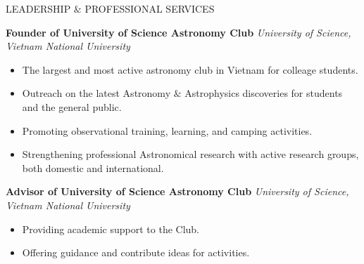 \documentclass{resume} %
\begin{document}

 


\begin{rSection}{LEADERSHIP $\&$ PROFESSIONAL SERVICES}

\textbf{Founder of University of Science Astronomy Club} \hfill \textit{University of Science, Vietnam National University}
\begin{itemize}
    \itemsep -3pt {} 
     \item The largest and most active astronomy club in Vietnam for colleage students. 
     \item Outreach on the latest Astronomy $\&$ Astrophysics discoveries for students and the general public.

    \item Promoting observational training, learning, and camping activities.

    \item Strengthening professional Astronomical research with active research groups, both domestic and international.
 \end{itemize}
\textbf{Advisor of University of Science Astronomy Club} \hfill \textit{University of Science, Vietnam National University}
\begin{itemize}
    \itemsep -3pt {} 
     \item Providing academic support to the Club. 
     \item Offering guidance and contribute ideas for activities.
 \end{itemize} 
\end{rSection} 
\end{document}
